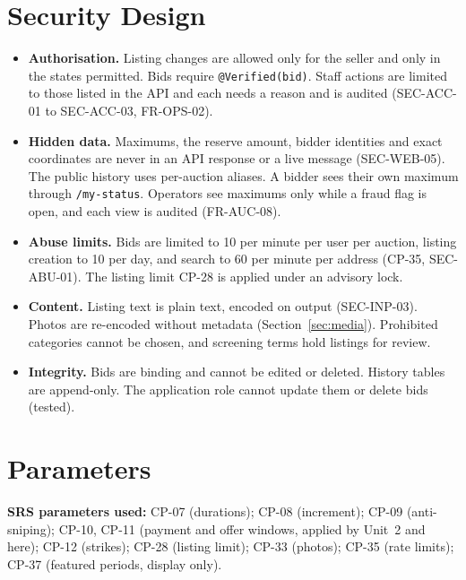 \documentclass[11pt,a4paper]{article}
\begin{document}
\section{Security Design}
\begin{itemize}[nosep]
  \item \textbf{Authorisation.} Listing changes are allowed only for the seller and only in the states permitted. Bids require \texttt{@Verified(bid)}. Staff actions are limited to those listed in the API and each needs a reason and is audited (SEC-ACC-01 to SEC-ACC-03, FR-OPS-02).
  \item \textbf{Hidden data.} Maximums, the reserve amount, bidder identities and exact coordinates are never in an API response or a live message (SEC-WEB-05). The public history uses per-auction aliases. A bidder sees their own maximum through \texttt{/my-status}. Operators see maximums only while a fraud flag is open, and each view is audited (FR-AUC-08).
  \item \textbf{Abuse limits.} Bids are limited to 10 per minute per user per auction, listing creation to 10 per day, and search to 60 per minute per address (CP-35, SEC-ABU-01). The listing limit CP-28 is applied under an advisory lock.
  \item \textbf{Content.} Listing text is plain text, encoded on output (SEC-INP-03). Photos are re-encoded without metadata (Section~\ref{sec:media}). Prohibited categories cannot be chosen, and screening terms hold listings for review.
  \item \textbf{Integrity.} Bids are binding and cannot be edited or deleted. History tables are append-only. The application role cannot update them or delete bids (tested).
\end{itemize}

\section{Parameters}
\textbf{SRS parameters used:} CP-07 (durations); CP-08 (increment); CP-09 (anti-sniping); CP-10, CP-11 (payment and offer windows, applied by Unit~2 and here); CP-12 (strikes); CP-28 (listing limit); CP-33 (photos); CP-35 (rate limits); CP-37 (featured periods, display only).
\end{document}
